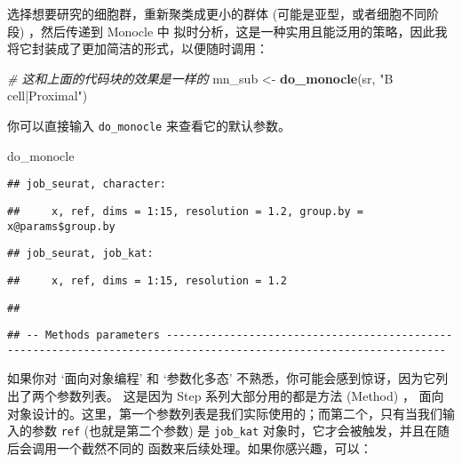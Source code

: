 \documentclass[
]{article}
\newenvironment{Shaded}{\begin{snugshade}}{\end{snugshade}}
\newcommand{\CommentTok}[1]{\textcolor[rgb]{0.56,0.35,0.01}{\textit{#1}}}
\newcommand{\KeywordTok}[1]{\textcolor[rgb]{0.13,0.29,0.53}{\textbf{#1}}}
\newcommand{\NormalTok}[1]{#1}
\newcommand{\StringTok}[1]{\textcolor[rgb]{0.31,0.60,0.02}{#1}}
\begin{document}
选择想要研究的细胞群，重新聚类成更小的群体 (可能是亚型，或者细胞不同阶段) ，然后传递到 Monocle 中
拟时分析，这是一种实用且能泛用的策略，因此我将它封装成了更加简洁的形式，以便随时调用：

\begin{Shaded}
\begin{Highlighting}[]
\CommentTok{\# 这和上面的代码块的效果是一样的}
\NormalTok{mn\_sub \textless{}{-}}\StringTok{ }\KeywordTok{do\_monocle}\NormalTok{(sr, }\StringTok{"B cell|Proximal"}\NormalTok{)}
\end{Highlighting}
\end{Shaded}

你可以直接输入 \texttt{do\_monocle} 来查看它的默认参数。

\begin{Shaded}
\begin{Highlighting}[]
\NormalTok{do\_monocle}
\end{Highlighting}
\end{Shaded}

\begin{verbatim}
## job_seurat, character:
\end{verbatim}

\begin{verbatim}
##     x, ref, dims = 1:15, resolution = 1.2, group.by = x@params$group.by
\end{verbatim}

\begin{verbatim}
## job_seurat, job_kat:
\end{verbatim}

\begin{verbatim}
##     x, ref, dims = 1:15, resolution = 1.2
\end{verbatim}

\begin{verbatim}
## 
\end{verbatim}

\begin{verbatim}
## -- Methods parameters ------------------------------------------------------------------------------------------------------------------
\end{verbatim}

如果你对 `面向对象编程' 和 `参数化多态' 不熟悉，你可能会感到惊讶，因为它列出了两个参数列表。
这是因为 Step 系列大部分用的都是方法 (Method) ，
面向对象设计的。这里，第一个参数列表是我们实际使用的；而第二个，只有当我们输入的参数 \texttt{ref}
(也就是第二个参数) 是 \texttt{job\_kat} 对象时，它才会被触发，并且在随后会调用一个截然不同的
函数来后续处理。如果你感兴趣，可以：
\end{document}
